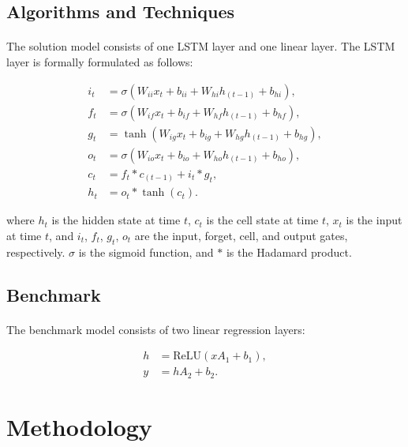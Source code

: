 \documentclass[12pt, letterpaper]{article}
\begin{document}
\subsection{Algorithms and Techniques}

\paragraph{}
The solution model consists of one LSTM layer and one linear layer. The LSTM layer is formally formulated as follows:

\begin{align*}
    i_t & =\sigma\left(W_{ii}x_t+b_{ii}+W_{hi}h_{(t-1)}+b_{hi}\right), \\
    f_t & =\sigma\left(W_{if}x_t+b_{if}+W_{hf}h_{(t-1)}+b_{hf}\right), \\
    g_t & =\tanh\left(W_{ig}x_t+b_{ig}+W_{hg}h_{(t-1)}+b_{hg}\right), \\
    o_t & =\sigma\left(W_{io}x_t+b_{io}+W_{ho}h_{(t-1)}+b_{ho}\right), \\
    c_t & =f_t*c_{(t-1)}+i_t*g_t, \\
    h_t & =o_t*\tanh(c_t).
\end{align*}

where \(h_t\) is the hidden state at time \(t\), \(c_t\) is the cell state at time \(t\), \(x_t\) is the input at time \(t\), and \(i_t\), \(f_t\), \(g_t\), \(o_t\) are the input, forget, cell, and output gates, respectively. \(\sigma\) is the sigmoid function, and \(*\) is the Hadamard product.

\subsection{Benchmark}

\paragraph{}
The benchmark model consists of two linear regression layers:

\begin{align*}
    h & =\mathrm{ReLU}\left(xA_1+b_1\right), \\
    y  & =hA_2+b_2.
\end{align*}

\section{Methodology} %
\end{document}
